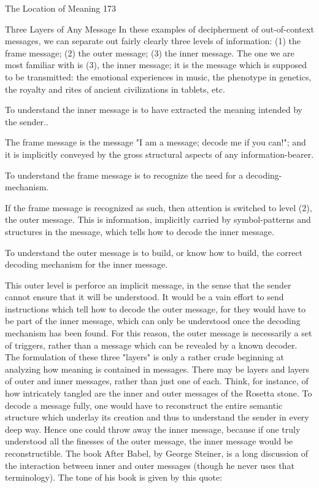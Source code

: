 The Location of Meaning                                                               173

Three Layers of Any Message
        In these examples of decipherment of out-of-context messages, we can separate
out fairly clearly three levels of information: (1) the frame message; (2) the outer
message; (3) the inner message. The one we are most familiar with is (3), the inner
message; it is the message which is supposed to be transmitted: the emotional
experiences in music, the phenotype in genetics, the royalty and rites of ancient
civilizations in tablets, etc.

    To understand the inner message is to have extracted the meaning intended by the
                                        sender..

        The frame message is the message "I am a message; decode me if you can!"; and
it is implicitly conveyed by the gross structural aspects of any information-bearer.

        To understand the frame message is to recognize the need for a decoding-
                                     mechanism.

        If the frame message is recognized as such, then attention is switched to level (2),
the outer message. This is information, implicitly carried by symbol-patterns and
structures in the message, which tells how to decode the inner message.

     To understand the outer message is to build, or know how to build, the correct
                     decoding mechanism for the inner message.

This outer level is perforce an implicit message, in the sense that the sender cannot ensure
that it will be understood. It would be a vain effort to send instructions which tell how to
decode the outer message, for they would have to be part of the inner message, which can
only be understood once the decoding mechanism has been found. For this reason, the
outer message is necessarily a set of triggers, rather than a message which can be
revealed by a known decoder.
         The formulation of these three "layers" is only a rather crude beginning at
analyzing how meaning is contained in messages. There may be layers and layers of
outer and inner messages, rather than just one of each. Think, for instance, of how
intricately tangled are the inner and outer messages of the Rosetta stone. To decode a
message fully, one would have to reconstruct the entire semantic structure which
underlay its creation and thus to understand the sender in every deep way. Hence one
could throw away the inner message, because if one truly understood all the finesses of
the outer message, the inner message would be reconstructible.
         The book After Babel, by George Steiner, is a long discussion of the interaction
between inner and outer messages (though he never uses that terminology). The tone of
his book is given by this quote:

